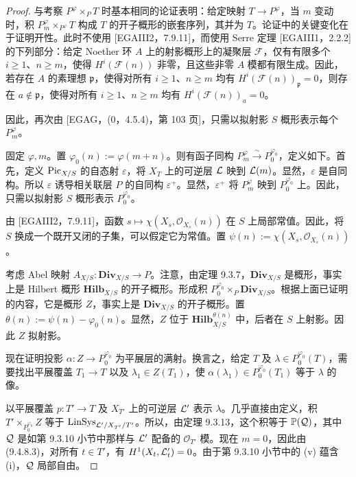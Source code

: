\begin{proof}
与考察 $P^\varphi\times_P T$ 时基本相同的论证表明：给定映射 $T\to P^\varphi$，当 $m$ 变动时，积 $P_m^\varphi\times_{P^\varphi}T$ 构成 $T$ 的开子概形的嵌套序列，其并为 $T$。论证中的关键变化在于证明开性。此时不使用 [EGAIII2，7.9.11]，而使用 Serre 定理 [EGAIII1，2.2.2] 的下列部分：给定 Noether 环 $A$ 上的射影概形上的凝聚层 $\mathcal F$，仅有有限多个 $i\geq1$、$n\geq m$，使得 $H^i(\mathcal F(n))$ 非零，且这些非零 $A$ 模都有限生成。因此，若存在 $A$ 的素理想 $\mathfrak p$，使得对所有 $i\geq1$、$n\geq m$ 均有 $H^i(\mathcal F(n))_{\mathfrak p}=0$，则存在 $a\notin\mathfrak p$，使得对所有 $i\geq1$、$n\geq m$ 均有 $H^i(\mathcal F(n))_a=0$。

因此，再次由 [EGAG，(0，4.5.4)，第 103 页]，只需以拟射影 $S$ 概形表示每个 $P_m^\varphi$。

固定 $\varphi,m$。置 $\varphi_0(n):=\varphi(m+n)$。则有函子同构 $P_m^\varphi\xrightarrow{\sim}P_0^{\varphi_0}$，定义如下。首先，定义 $\operatorname{Pic}_{X/S}$ 的自态射 $\varepsilon$，将 $X_T$ 上的可逆层 $\mathcal L$ 映到 $\mathcal L(m)$。显然，$\varepsilon$ 是自同构。所以 $\varepsilon$ 诱导相关联层 $P$ 的自同构 $\varepsilon^+$。显然，$\varepsilon^+$ 将 $P_m^\varphi$ 映到 $P_0^{\varphi_0}$ 上。因此，只需以拟射影 $S$ 概形表示 $P_0^{\varphi_0}$。

由 [EGAIII2，7.9.11]，函数 $s\mapsto\chi(X_s,\mathcal O_{X_s}(n))$ 在 $S$ 上局部常值。因此，将 $S$ 换成一个既开又闭的子集，可以假定它为常值。置 $\psi(n):=\chi(X_s,\mathcal O_{X_s}(n))$。

考虑 Abel 映射 $A_{X/S}:\mathbf{Div}_{X/S}\to P$。注意，由定理 9.3.7，$\mathbf{Div}_{X/S}$ 是概形，事实上是 Hilbert 概形 $\mathbf{Hilb}_{X/S}$ 的开子概形。形成积 $P_0^{\varphi_0}\times_P\mathbf{Div}_{X/S}$。根据上面已证明的内容，它是概形 $Z$，事实上是 $\mathbf{Div}_{X/S}$ 的开子概形。置 $\theta(n):=\psi(n)-\varphi_0(n)$。显然，$Z$ 位于 $\mathbf{Hilb}_{X/S}^{\theta(n)}$ 中，后者在 $S$ 上射影。因此 $Z$ 拟射影。

现在证明投影 $\alpha:Z\to P_0^{\varphi_0}$ 为平展层的满射。换言之，给定 $T$ 及 $\lambda\in P_0^{\varphi_0}(T)$，需要找出平展覆盖 $T_1\to T$ 以及 $\lambda_1\in Z(T_1)$，使 $\alpha(\lambda_1)\in P_0^{\varphi_0}(T_1)$ 等于 $\lambda$ 的像。

以平展覆盖 $p:T'\to T$ 及 $X_{T'}$ 上的可逆层 $\mathcal L'$ 表示 $\lambda$。几乎直接由定义，积 $T'\times_{P_0^{\varphi_0}}Z$ 等于 $\operatorname{LinSys}_{\mathcal L'/X_{T'}/T'}$。所以，由定理 9.3.13，这个积等于 $\mathbb P(\mathcal Q)$，其中 $\mathcal Q$ 是如第 9.3.10 小节中那样与 $\mathcal L'$ 配备的 $\mathcal O_{T'}$ 模。现在 $m=0$，因此由 (9.4.8.3)，对所有 $t\in T'$，有 $H^1(X_t,\mathcal L'_t)=0$。由于第 9.3.10 小节中的 (v) 蕴含 (i)，$\mathcal Q$ 局部自由。


\end{proof}
